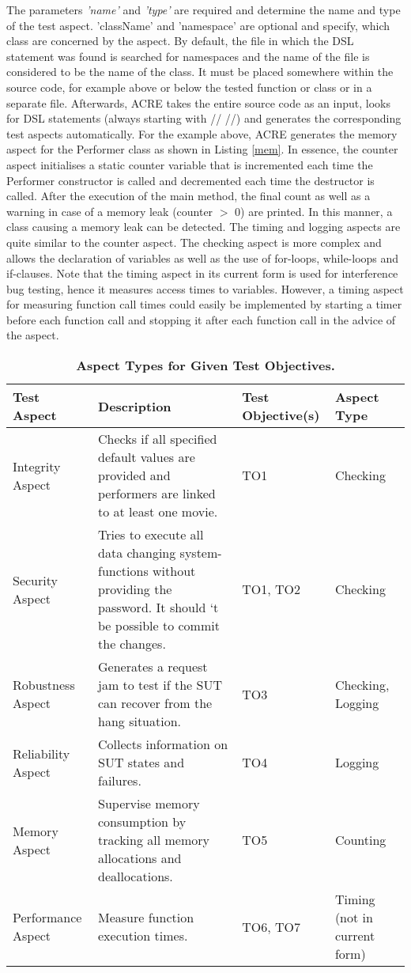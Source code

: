 The parameters \textit{'name'} and \textit{'type'} are required and determine the name and type of the test aspect. 'className' and 'namespace' are optional and specify, which class are concerned by the aspect. By default, the file in which the DSL statement was found is searched for namespaces and the name of the file is considered to be the name of the class.  It must be placed somewhere within the source code, for example above or below the tested function or class or in a separate file. Afterwards, ACRE takes the entire source code as an input, looks for DSL statements (always starting with // //) and generates the corresponding test aspects automatically. For the example above, ACRE generates the memory aspect for the Performer class as shown in Listing \ref{mem}. In essence, the counter aspect initialises a static counter variable that is incremented each time the Performer constructor is called and decremented each time the destructor is called. After the execution of the main method, the final count as well as a warning in case of a memory leak (counter $>$ 0) are printed. In this manner, a class causing a memory leak can be detected. The timing and logging aspects are quite similar to the counter aspect. The checking aspect is more complex and allows the declaration of variables as well as the use of for-loops, while-loops and if-clauses. Note that the timing aspect in its current form is used for interference bug testing, hence it measures access times to variables. However, a timing aspect for measuring function call times could easily be implemented by starting a timer before each function call and stopping it after each function call in the advice of the aspect.

\begin{table}[h]
\caption{\textbf{Aspect Types for Given Test Objectives.}}
\begin{tabular}{|>{\raggedright}p{2cm}|p{8cm}|p{1cm}|p{2cm}|}
\hline
\textbf{Test \quad Aspect} & \textbf{Description} & \textbf{Test Objective(s)} & \textbf{Aspect Type}\\
\hline
Integrity Aspect & Checks if all specified default values are provided and performers are linked to at least one movie. & TO1 & Checking \\
\hline
Security Aspect & Tries to execute all data changing system-functions without providing the password. It should ‘t be possible to commit the changes. & TO1, TO2 & Checking\\
\hline
Robustness Aspect & Generates a request jam to test if the SUT can recover from the hang situation. & TO3 & Checking, Logging\\
\hline
Reliability Aspect & Collects information on SUT states and failures. & TO4 & Logging\\
\hline
Memory Aspect & Supervise memory consumption by tracking all memory allocations and deallocations. & TO5 & Counting\\
\hline
Performance Aspect & Measure function execution times. & TO6, TO7 & Timing (not in current form)\\
\hline
\end{tabular}
\label{aspect-test}
\end{table}

